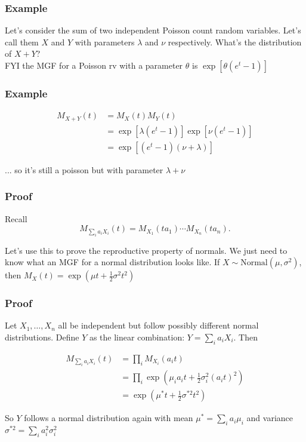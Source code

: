 \documentclass{beamer}
\begin{document}
\begin{frame}
\frametitle{Example}

Let's consider the sum of two independent Poisson count random variables. Let's call them $X$ and $Y$ with parameters $\lambda$ and $\nu$ respectively. What's the distribution of $X+Y$? \\

FYI the MGF for a Poisson rv with a parameter $\theta$ is $\exp[\theta (e^t - 1)]$
\end{frame}

\begin{frame}
\frametitle{Example}

\begin{align*}
M_{X+Y}(t) &= M_X(t)M_Y(t) \\
&= \exp[\lambda (e^t - 1)] \exp[\nu (e^t - 1)]  \\
&= \exp[ (e^t - 1)(\nu + \lambda)]
\end{align*}

... so it's still a poisson but with parameter $\lambda + \nu$
\end{frame}


\begin{frame}
\frametitle{Proof}

Recall 
\[
M_{\sum_i a_i X_i}(t) = M_{X_1}(t a_1) \cdots M_{X_n}(t a_n).
\]

Let's use this to prove the reproductive property of normals. We just need to know what an MGF for a normal distribution looks like. If $X \sim \text{Normal}(\mu, \sigma^2)$, then $M_X(t) = \exp(\mu t + \frac{1}{2}\sigma^2 t^2)$

\end{frame}

\begin{frame}
\frametitle{Proof}

Let $X_1, \ldots, X_n$ all be independent but follow possibly different normal distributions. Define $Y$ as the linear combination: $Y = \sum_i a_i X_i$. Then

\begin{align*}
M_{\sum_i a_i X_i}(t) &= \prod_i M_{X_i}(a_i t) \\
&= \prod_i \exp(\mu_i a_i t + \frac{1}{2}\sigma_i^2 (a_i t)^2) \\
&= \exp(\mu^*t + \frac{1}{2}\sigma^{*2} t^2)
\end{align*}

So $Y$ follows a normal distribution again with mean $\mu^* = \sum_i a_i \mu_i$ and variance $\sigma^{*2} = \sum_i a_i^2 \sigma_i^2$
\end{frame}

\end{document}
